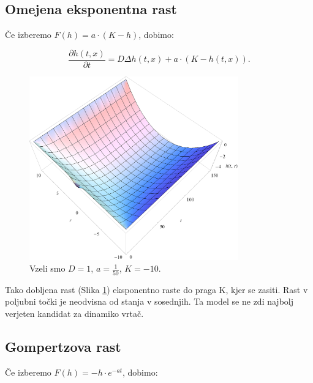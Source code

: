 \documentclass[a4paper, twoside, 12pt]{book}
\begin{document}
    \subsection{Omejena eksponentna rast}

    Če izberemo $F(h) = a \cdot (K - h)$, dobimo:

    \begin{equation}
      \frac{ \partial h(t,x) }{ \partial t} = D \Delta h(t,x) + a \cdot (K - h(t,x)).
      \label{difuzija-omejena-eksponentna-rast}
    \end{equation}
    \begin{figure}[h]
      \begin{center}
        \includegraphics[width=9cm]{slike/difuzija-omejena-eksponentna-rast2}
      \end{center}
      \caption{Vzeli smo $D=1$, $a=\frac{1}{50}$, $K=-10$.}
      \label{fig:difuzija-omejena-eksponentna-rast}
    \end{figure}

    Tako dobljena rast (Slika \ref{fig:difuzija-omejena-eksponentna-rast}) eksponentno raste do praga K, kjer se zasiti. Rast v poljubni točki je neodvisna od stanja v sosednjih. Ta model se ne zdi najbolj verjeten kandidat za dinamiko vrtač.

    \subsection{Gompertzova rast}

    Če izberemo $F(h) = - h \cdot e^{-a t}$, dobimo:
\end{document}
